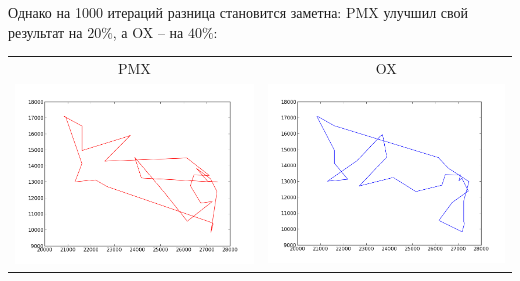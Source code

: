 \documentclass[a4paper]{article}
\begin{document}
Однако на 1000 итераций разница становится заметна: PMX улучшил свой результат на $20\%$, а OX -- на $40\%$:

\begin{tabular}{cc}
PMX & OX \\
\includegraphics[width=7cm]{pmx1000.png} & \includegraphics[width=7cm]{ox1000.png}
\end{tabular}
\end{document}
